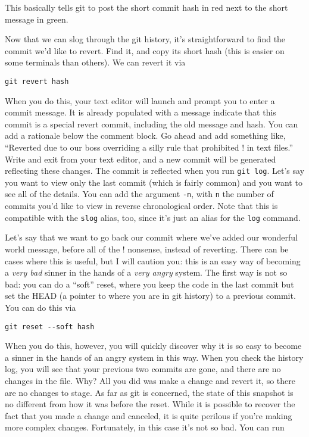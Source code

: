 \par{
This basically tells git to post the short commit hash in red next to the
short message in green. 

\par{
Now that we can slog through the git history, it's straightforward to find the
commit we'd like to revert. Find it, and copy its short hash (this is easier
on some terminals than others). We can revert it via 
}

\begin{verbatim}
git revert hash
\end{verbatim}

\par{
When you do this, your text editor will launch and prompt you to enter a
commit message. It is already populated with a message indicate that this
commit is a special revert commit, including the old message and hash. You can
add a rationale below the comment block. Go ahead and add something like,
``Reverted due to our boss overriding a silly rule that prohibited ! in text
files.'' Write and exit from your text editor, and a new commit will be
generated reflecting these changes. The commit is reflected when you run
\verb+git log+. Let's say you want to view only the last commit (which is
fairly common) and you want to see all of the details. You can add the
argument \verb+-n+, with \verb+n+ the number of commits you'd like to view in
reverse chronological order. Note that this is compatible with the
\verb+slog+ alias, too, since it's just an alias for the \verb+log+ command. 
}

\par{
Let's say that we want to go back our commit where we've added our wonderful
world message, before all of the ! nonsense, instead of reverting. There can
be cases where this is useful, but I will caution you: this is an easy way of
becoming a \emph{very bad} sinner in the hands of a \emph{very angry} system.
The first way is not so bad: you can do a ``soft'' reset, where you keep the
code in the last commit but set the HEAD (a pointer to where you are in git
history) to a previous commit. You can do this via
}

\begin{verbatim}
git reset --soft hash
\end{verbatim}

\par{
When you do this, however, you will quickly discover why it is so easy to
become a sinner in the hands of an angry system in this way. When you check
the history log, you will see that your previous two commits are gone, and
there are no changes in the file. Why? All you did was make a change and
revert it, so there are no changes to stage. As far as git is concerned, the
state of this snapshot is no different from how it was before the reset. While
it is possible to recover the fact that you made a change and canceled, it is
quite perilous if you're making more complex changes. Fortunately, in this
case it's not so bad. You can run
}

}
